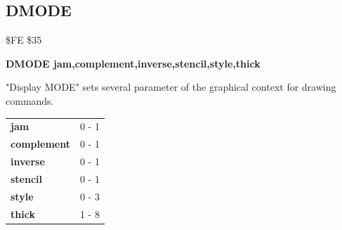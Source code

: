 \subsection{DMODE}
\begin{description}[leftmargin=2cm,style=nextline]
\item [Token:] \$FE \$35
\item [Format:] {\bf DMODE jam,complement,inverse,stencil,style,thick}
\item [Usage:]
   "Display MODE" sets several parameter
   of the graphical context for drawing commands.

\ttfamily
\begin{tabular}{|l|l|}
\hline
   {\bf jam}        &  0 - 1 \\
   {\bf complement} &  0 - 1 \\
   {\bf inverse}    &  0 - 1 \\
   {\bf stencil}    &  0 - 1 \\
   {\bf style}      &  0 - 3 \\
   {\bf thick}      &  1 - 8 \\
\hline
\end{tabular}
\end{description}


\newpage
